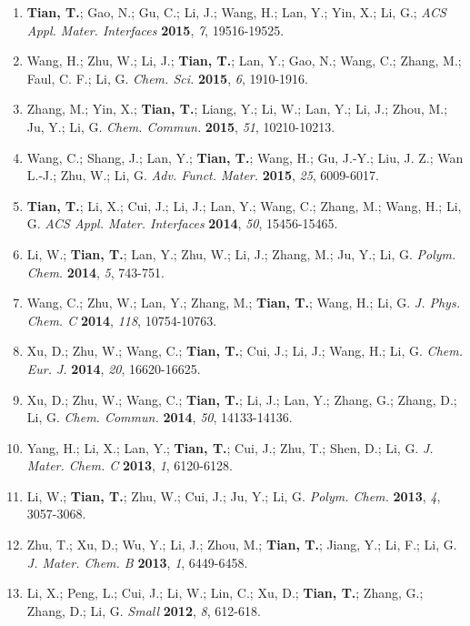 \documentclass[margin]{res}
\begin{document}
\begin{resume}
\begin{enumerate}
    \item \textbf{Tian, T.}; Gao, N.; Gu, C.; Li, J.; Wang, H.; Lan, Y.;
    Yin, X.; Li, G.; \textit{ACS Appl. Mater. Interfaces}
    \textbf{2015}, \textit{7}, 19516-19525.
  \item Wang, H.; Zhu, W.; Li, J.; \textbf{Tian, T.}; Lan, Y.; Gao,
    N.; Wang, C.; Zhang, M.; Faul, C. F.; Li, G. \textit{Chem. Sci.}
    \textbf{2015}, \textit{6}, 1910-1916.
  \item Zhang, M.; Yin, X.; \textbf{Tian, T.}; Liang, Y.; Li, W.; Lan,
    Y.; Li, J.; Zhou, M.; Ju, Y.; Li, G. \textit{Chem. Commun.}
    \textbf{2015}, \textit{51}, 10210-10213.
  \item Wang, C.; Shang, J.; Lan, Y.; \textbf{Tian, T.}; Wang, H.; Gu,
    J.-Y.; Liu, J. Z.; Wan L.-J.; Zhu, W.; Li,
    G. \textit{Adv. Funct. Mater.} \textbf{2015}, \textit{25},
    6009-6017.
    \item \textbf{Tian, T.}; Li, X.; Cui, J.; Li, J.; Lan, Y.; Wang, C.;
    Zhang, M.; Wang, H.; Li, G. \textit{ACS Appl. Mater. Interfaces}
    \textbf{2014}, \textit{50}, 15456-15465.
  \item Li, W.; \textbf{Tian, T.}; Lan, Y.; Zhu, W.; Li, J.; Zhang,
    M.; Ju, Y.; Li, G. \textit{Polym. Chem.} \textbf{2014},
    \textit{5}, 743-751.
  \item Wang, C.; Zhu, W.; Lan, Y.; Zhang, M.; \textbf{Tian, T.};
    Wang, H.; Li, G. \textit{J. Phys. Chem. C} \textbf{2014},
    \textit{118}, 10754-10763.
  \item Xu, D.; Zhu, W.; Wang, C.; \textbf{Tian, T.}; Cui, J.; Li, J.;
    Wang, H.; Li, G. \textit{Chem. Eur. J.} \textbf{2014},
    \textit{20}, 16620-16625.
  \item Xu, D.; Zhu, W.; Wang, C.; \textbf{Tian, T.}; Li, J.; Lan, Y.;
    Zhang, G.; Zhang, D.; Li, G. \textit{Chem. Commun.} \textbf{2014},
    \textit{50}, 14133-14136.
  \item Yang, H.; Li, X.; Lan, Y.; \textbf{Tian, T.}; Cui, J.; Zhu,
    T.; Shen, D.; Li, G. \textit{J. Mater. Chem. C} \textbf{2013},
    \textit{1}, 6120-6128.
  \item Li, W.; \textbf{Tian, T.}; Zhu, W.; Cui, J.; Ju, Y.; Li,
    G. \textit{Polym. Chem.} \textbf{2013}, \textit{4}, 3057-3068.
  \item Zhu, T.; Xu, D.; Wu, Y.; Li, J.; Zhou, M.; \textbf{Tian, T.};
    Jiang, Y.; Li, F.; Li, G. \textit{J. Mater. Chem. B}
    \textbf{2013}, \textit{1}, 6449-6458.
  \item Li, X.; Peng, L.; Cui, J.; Li, W.; Lin, C.; Xu, D.;
    \textbf{Tian, T.}; Zhang, G.; Zhang, D.; Li, G. \textit{Small}
    \textbf{2012}, \textit{8}, 612-618.

\end{enumerate}



\end{resume}
\end{document}
